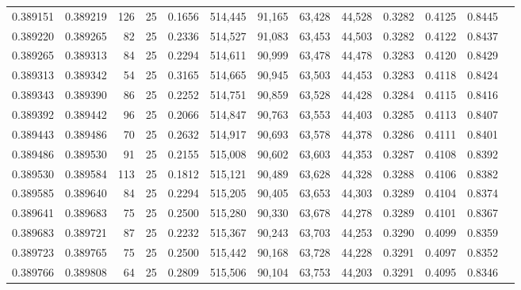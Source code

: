 \begin{tabular}{rrrrrrrrrrrrr}
0.389151 & 0.389219 &   126 &  25 &                                     0.1656 & 514,445 &  91,165 &  63,428 &  44,528 & 0.3282 & 0.4125 & 0.8445 \\
0.389220 & 0.389265 &    82 &  25 &                                     0.2336 & 514,527 &  91,083 &  63,453 &  44,503 & 0.3282 & 0.4122 & 0.8437 \\
0.389265 & 0.389313 &    84 &  25 &                                     0.2294 & 514,611 &  90,999 &  63,478 &  44,478 & 0.3283 & 0.4120 & 0.8429 \\
0.389313 & 0.389342 &    54 &  25 &                                     0.3165 & 514,665 &  90,945 &  63,503 &  44,453 & 0.3283 & 0.4118 & 0.8424 \\
0.389343 & 0.389390 &    86 &  25 &                                     0.2252 & 514,751 &  90,859 &  63,528 &  44,428 & 0.3284 & 0.4115 & 0.8416 \\
0.389392 & 0.389442 &    96 &  25 &                                     0.2066 & 514,847 &  90,763 &  63,553 &  44,403 & 0.3285 & 0.4113 & 0.8407 \\
0.389443 & 0.389486 &    70 &  25 &                                     0.2632 & 514,917 &  90,693 &  63,578 &  44,378 & 0.3286 & 0.4111 & 0.8401 \\
0.389486 & 0.389530 &    91 &  25 &                                     0.2155 & 515,008 &  90,602 &  63,603 &  44,353 & 0.3287 & 0.4108 & 0.8392 \\
0.389530 & 0.389584 &   113 &  25 &                                     0.1812 & 515,121 &  90,489 &  63,628 &  44,328 & 0.3288 & 0.4106 & 0.8382 \\
0.389585 & 0.389640 &    84 &  25 &                                     0.2294 & 515,205 &  90,405 &  63,653 &  44,303 & 0.3289 & 0.4104 & 0.8374 \\
0.389641 & 0.389683 &    75 &  25 &                                     0.2500 & 515,280 &  90,330 &  63,678 &  44,278 & 0.3289 & 0.4101 & 0.8367 \\
0.389683 & 0.389721 &    87 &  25 &                                     0.2232 & 515,367 &  90,243 &  63,703 &  44,253 & 0.3290 & 0.4099 & 0.8359 \\
0.389723 & 0.389765 &    75 &  25 &                                     0.2500 & 515,442 &  90,168 &  63,728 &  44,228 & 0.3291 & 0.4097 & 0.8352 \\
0.389766 & 0.389808 &    64 &  25 &                                     0.2809 & 515,506 &  90,104 &  63,753 &  44,203 & 0.3291 & 0.4095 & 0.8346 \\

\end{tabular}

